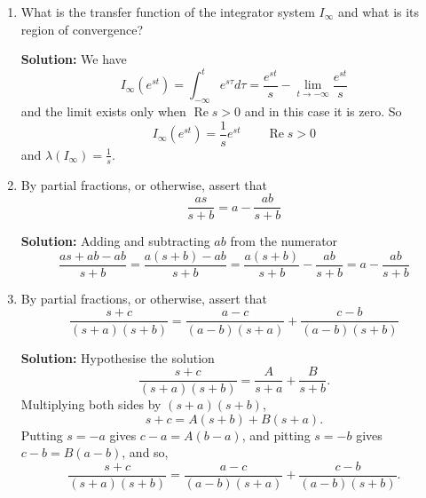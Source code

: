 \documentclass[11pt,a4paper]{book}
\theoremstyle{plain}
\numberwithin{equation}{section}
\renewcommand{\Re}{\operatorname{Re}}
\newenvironment{solution}{\begin{footnotesize}\textbf{Solution:}}{\end{footnotesize}}
\newenvironment{excersizelist}{%
  \renewcommand*{\theenumi}{\thechapter.\arabic{enumi}}%
  \newcommand\itemadvanced{\stepcounter{enumi}\item[$\ast$\, \theenumi.]}
  \begin{enumerate}
}{%
  \end{enumerate}
}
\begin{document}
\begin{excersizelist}
\begin{solution}
We now show the result for the differentiator $D$.  Our approach works for all functions that will be of interest to us.  An alternative approach makes use of Lebesque's dominated convergence theorem~\citep[page~179]{Rudin_real_and_complex_analysis}.  
Put $y = D(x)$.  Taking Laplace transforms
\[
\calL(y) = \calL\big(D(x)\big) = \int_{-\infty}^{\infty} D(x,t) e^{-st} dt.
\]
Integrating by parts 
\[
\calL(y) = \big[ x(t) e^{-st} \big]_{-\infty}^\infty + s\int_{-\infty}^{\infty} x(t) e^{-st} dt = \big[ x(t) e^{-st} \big]_{-\infty}^\infty + s\calL(x).
\]
The assumption that we make is that 
\[
\lim_{t\to\infty} x(t) e^{-st} = 0 \qquad \text{and} \qquad \lim_{t\to-\infty} x(t) e^{-st} = 0
\]
whenever $s$ is in the region of convergence of both $x$ and $y$.  In this case $\calL(y) = s\calL(x)$ as required.  Observe that our assumption is true if, for example, $x(t)$ is finite in time.

The result follows for the $k$th differentiator $D^k$ because
\[
\calL\big( D^k(y) \big) = \calL\big( D(D^{k-1}(y)) \big) = s \calL\big( D^{k-1}(y) \big)
\]
and unravelling this recursion gives
\[
\calL\big( D^k(y) \big) = \underbrace{s \times s \times \dots \times s}_{\text{$k-1$ times}} \times \calL\big( D(y) \big) = s^k \calL( y ) = \lambda(D^k)\calL(y) 
\]
as required.
\end{solution}


\item What is the transfer function of the integrator system $I_\infty$ and what is its region of convergence? 
\begin{solution}
We have
\[
I_\infty(e^{st}) = \int_{-\infty}^t e^{s\tau} d\tau = \frac{e^{st}}{s} - \lim_{t\to -\infty}\frac{e^{st}}{s}
\]
and the limit exists only when $\Re{s} > 0$ and in this case it is zero.  So
\[
I_\infty(e^{st}) = \frac{1}{s} e^{st} \qquad \Re{s} > 0
\]
and $\lambda(I_\infty) = \tfrac{1}{s}$.
\end{solution}


\item \label{exer:partialfracfirstorder} By partial fractions, or otherwise, assert that
\[
\frac{as}{s+b} = a - \frac{ab}{s+b}
\]
\begin{solution}
Adding and subtracting $ab$ from the numerator
\[
\frac{as+ab-ab}{s+b} = \frac{a(s+b)-ab}{s+b} = \frac{a(s+b)}{s+b} - \frac{ab}{s+b} = a - \frac{ab}{s+b}
\]
\end{solution}

\item \label{exer:partialfracsecondorder} By partial fractions, or otherwise, assert that
\[
\frac{s + c}{(s+a)(s+b)} = \frac{a-c}{(a-b)(s+a)} + \frac{c-b}{(a-b)(s+b)}
\]
\begin{solution}
Hypothesise the solution
\[
\frac{s + c}{(s+a)(s+b)} = \frac{A}{s+a} + \frac{B}{s+b}.
\]
Multiplying both sides by $(s+a)(s+b)$,
\[
s+c = A(s+b) + B(s+a).
\]
Putting $s = -a$ gives $c-a = A(b-a)$, and pitting $s=-b$ gives $c-b = B(a-b)$, and so,
\[
\frac{s+c}{(s+a)(s+b)} = \frac{a-c}{(a-b)(s+a)} + \frac{c-b}{(a-b)(s+b)}.
\]
\end{solution}


\end{excersizelist}
\end{document}
